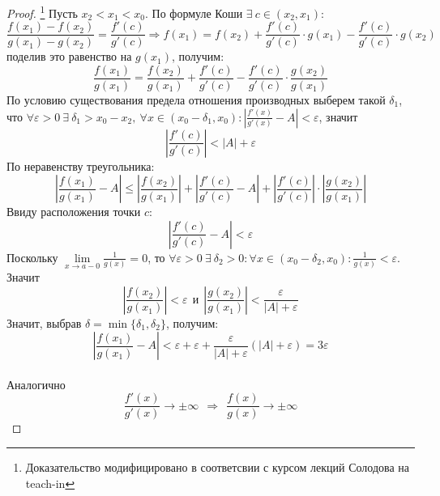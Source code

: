 \documentclass[a4paper, 12pt]{article}
\renewcommand{\epsilon}{\varepsilon}
\theoremstyle{definition}
\begin{document}
        \begin{proof}\footnote{Доказательство модифицировано в соответсвии с курсом лекций Солодова на teach-in}
            Пусть $x_2<x_1<x_0$. По формуле Коши $\exists\ c\in (x_2,x_1)$:
            \[\frac{f(x_1)-f(x_2)}{g(x_1)-g(x_2)}=\frac{f'(c)}{g'(c)} \Rightarrow f(x_1)=f(x_2)+\frac{f'(c)}{g'(c)}\cdot g(x_1)-\frac{f'(c)}{g'(c)}\cdot g(x_2)\]
            поделив это равенство на $g(x_1)$, получим:
            \[\frac{f(x_1)}{g(x_1)}=\frac{f(x_2)}{g(x_1)}+\frac{f'(c)}{g'(c)}-\frac{f'(c)}{g'(c)}\cdot \frac{g(x_2)}{g(x_1)}\]
            По условию существования предела отношения производных выберем такой $\delta_1$, что $\forall \epsilon>0\ \exists\ \delta_1>x_0-x_2,\ \forall x\in (x_0-\delta_1, x_0): |\frac{f'(x)}{g'(x)}-A|<\epsilon$, значит\\
            \[|\frac{f'(c)}{g'(c)}|<|A|+\epsilon\]
            По неравенству треугольника:
            \[|\frac{f(x_1)}{g(x_1)}-A|\leq |\frac{f(x_2)}{g(x_1)}|+|\frac{f'(c)}{g'(c)}-A|+|\frac{f'(c)}{g'(c)}|\cdot |\frac{g(x_2)}{g(x_1)}|\]
            Ввиду расположения точки $c$: \[|\frac{f'(c)}{g'(c)}-A|<\epsilon\]
            Поскольку $\lim\limits_{x\to a-0}\frac{1}{g(x)}=0$, то $\forall \epsilon>0\ \exists\ \delta_2>0: \forall x\in (x_0-\delta_2, x_0): \frac{1}{g(x)}<\epsilon$. Значит
            \[|\frac{f(x_2)}{g(x_1)}|<\epsilon\ \ \text{и}\ \ |\frac{g(x_2)}{g(x_1)}|<\frac{\epsilon}{|A|+\epsilon}\]
            Значит, выбрав $\delta = \min\{\delta_1,\delta_2\}$, получим:
            \[|\frac{f(x_1)}{g(x_1)}-A|<\epsilon+\epsilon+\frac{\epsilon}{|A|+\epsilon}(|A|+\epsilon)=3\epsilon\]
            \\
            Аналогично
            \[\frac{f'(x)}{g'(x)}\to \pm \infty\ \ \Rightarrow\ \ \frac{f(x)}{g(x)}\to \pm \infty\]
            
        \end{proof} 
\end{document}
